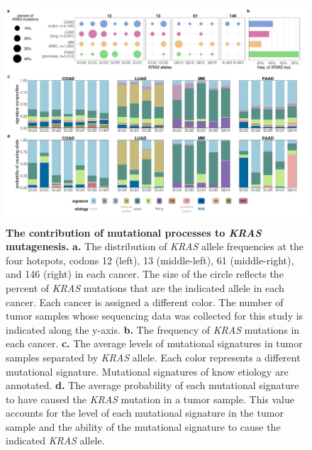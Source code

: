 \documentclass[english, 10pt, letterpaper]{article}
\newcommand{\KRAS}{\emph{KRAS}}
\begin{document}
\begin{figure}[h!]
\centering
\includegraphics[width=180mm]{figures/Fig_1.jpeg}
\caption{
    \textbf{The contribution of mutational processes to \KRAS{} mutagenesis.}
    \textbf{a.} The distribution of \KRAS{} allele frequencies at the four hotspots, codons 12 (left), 13 (middle-left), 61 (middle-right), and 146 (right) in each cancer. The size of the circle reflects the percent of \KRAS{} mutations that are the indicated allele in each cancer. Each cancer is assigned a different color. The number of tumor samples whose sequencing data was collected for this study is indicated along the y-axis. 
    \textbf{b.} The frequency of \KRAS{} mutations in each cancer.
    \textbf{c.} The average levels of mutational signatures in tumor samples separated by \KRAS{} allele. Each color represents a different mutational signature. Mutational signatures of know etiology are annotated.
    \textbf{d.} The average probability of each mutational signature to have caused the \KRAS{} mutation in a tumor sample. This value accounts for the level of each mutational signature in the tumor sample and the ability of the mutational signature to cause the indicated \KRAS{} allele.
}
\label{fig:mutational-signatures-main}
\end{figure}
\newpage
\newpage
\end{document}
